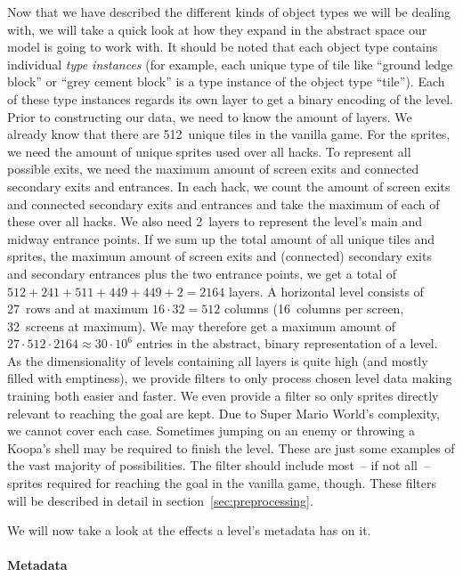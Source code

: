 Now that we have described the different kinds of object types we will
be dealing with, we will take a quick look at how they expand in the
abstract space our model is going to work with. It should be noted
that each object type contains individual \emph{type instances} (for
example, each unique type of tile like ``ground ledge block'' or
``grey cement block'' is a type instance of the object type ``tile'').
Each of these type instances regards its own layer to get a binary
encoding of the level. Prior to constructing our data, we need to know
the amount of layers. We already know that there are 512~unique tiles
in the vanilla game. For the sprites, we need the amount of unique
sprites used over all hacks. To represent all possible exits, we need
the maximum amount of screen exits and connected secondary exits and
entrances. In each hack, we count the amount of screen exits and
connected secondary exits and entrances and take the maximum of each
of these over all hacks. We also need 2~layers to represent the
level's main and midway entrance points. If we sum up the total amount
of all unique tiles and sprites, the maximum amount of screen exits
and (connected) secondary exits and secondary entrances plus the two
entrance points, we get a total of
$512 + 241 + 511 + 449 + 449 + 2 = 2164$ layers. A horizontal level
consists of 27~rows and at maximum $16 \cdot 32 = 512$ columns (16~columns
per screen, 32~screens at maximum). We may therefore get a maximum
amount of $27 \cdot 512 \cdot 2164 \approx 30 \cdot 10^{6}$ entries in the
abstract, binary representation of a level. \\
As the dimensionality of levels containing all layers is quite high
(and mostly filled with emptiness), we provide filters to only process
chosen level data making training both easier and faster. We even
provide a filter so only sprites directly relevant to reaching the
goal are kept. Due to Super Mario World's complexity, we cannot cover
each case. Sometimes jumping on an enemy or throwing a Koopa's shell
may be required to finish the level. These are just some examples of
the vast majority of possibilities. The filter should include most~--
if not all~-- sprites required for reaching the goal in the vanilla
game, though. These filters will be described in detail in
section~\ref{sec:preprocessing}.

We will now take a look at the effects a level's metadata has on it.

\paragraph{Metadata}
\label{par:metadata}

